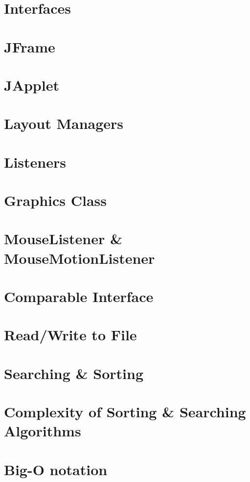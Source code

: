 \documentclass{article}
\begin{document}
\section{Interfaces}

\section{JFrame}

\section{JApplet}

\section{Layout Managers}

\section{Listeners}

\section{Graphics Class}

\section{MouseListener \& MouseMotionListener}

\section{Comparable Interface}

\section{Read/Write to File}

\newpage

\section{Searching \& Sorting}

\section{Complexity of Sorting \& Searching Algorithms}

\section{Big-O notation}
\end{document}
